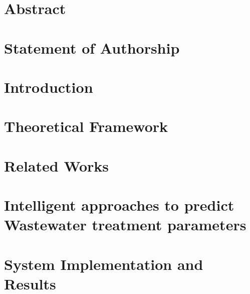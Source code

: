 \documentclass[twoside,openright,titlepage,numbers=noenddot,headinclude,footinclude=true,cleardoublepage=empty,listof=totoc,paper=a4,fontsize=11pt,australian,twoside=semi,DIV=calc]{scrreprt}
\begin{document}
  \frenchspacing
  \raggedbottom
  
  \pagestyle{plain}
  
  
  \singlespacing
  
  
  
  \onehalfspacing
  
  
  \chapter*{Abstract}
  
  
  \chapter*{Statement of Authorship}
  
  
  
  
  
  \cleardoublepage
  \pagestyle{scrheadings}
  \onehalfspacing
  
  \chapter{Introduction}\label{c:Introduction}
  
  
  \chapter{Theoretical Framework}\label{c:Background}
  
  
  \chapter{Related Works}\label{c:Related-Works}
  
  
  \chapter{Intelligent approaches to predict Wastewater treatment parameters}\label{c:Contribution-1}
  
  
  \chapter{System Implementation and Results}\label{c:Contribution-2}
  
\end{document}
